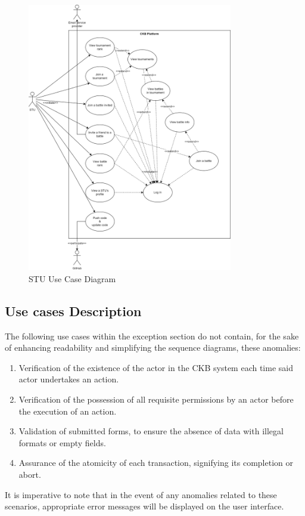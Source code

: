 \begin{figure}[H]
    \centering
    \includegraphics[width=0.8\textwidth]{images/sequence_diagrams/use_case_diagrams_STU.png}
    \caption{STU Use Case Diagram}
\end{figure}

\newpage

\subsection{Use cases Description}
The following use cases within the exception section do not contain, for the sake of enhancing readability and simplifying the sequence diagrams, these anomalies:
\begin{enumerate}
    \item Verification of the existence of the actor in the CKB system each time said actor undertakes an action.
    \item Verification of the possession of all requisite permissions by an actor before the execution of an action.
    \item Validation of submitted forms, to ensure the absence of data with illegal formats or empty fields.
    \item Assurance of the atomicity of each transaction, signifying its completion or abort.
\end{enumerate}
It is imperative to note that in the event of any anomalies related to these scenarios, appropriate error messages will be displayed on the user interface.

